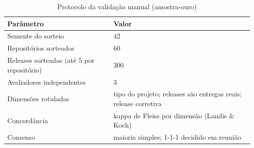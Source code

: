 \begin{table}[htbp]
\centering
\caption{Protocolo da validação manual (amostra-ouro)}
\label{tab:amostra_ouro}
\begin{tabular}{lp{8cm}}
\hline
Parâmetro & Valor \\
\hline
Semente do sorteio & 42 \\
Repositórios sorteados & 60 \\
Releases sorteadas (até 5 por repositório) & 300 \\
Avaliadores independentes & 3 \\
Dimensões rotuladas & tipo do projeto; releases são entregas reais; release corretiva \\
Concordância & kappa de Fleiss por dimensão (Landis \& Koch) \\
Consenso & maioria simples; 1-1-1 decidido em reunião \\
\hline
\end{tabular}
\end{table}
